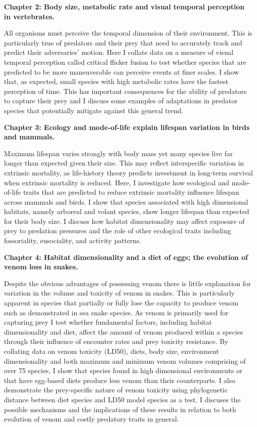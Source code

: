 \textbf{Chapter 2: Body size, metabolic rate and visual temporal perception in vertebrates.}

 All organisms must perceive the temporal dimension of their environment. This is particularly true of predators and their prey that need to accurately track and predict their adversaries' motion. Here I collate data on a measure of visual temporal perception called critical flicker fusion to test whether species that are predicted to be more maneuverable can perceive events at finer scales. I show that, as expected, small species with high metabolic rates have the fastest perception of time. This has important consequences for the ability of predators to capture their prey and I discuss some examples of adaptations in predator species that potentially mitigate against this general trend. 


\textbf{Chapter 3: Ecology and mode-of-life explain lifespan variation in birds and mammals.}

Maximum lifespan varies strongly with body mass yet many species live far longer than expected given their size. This may reflect interspecific variation in extrinsic mortality, as life-history theory predicts investment in long-term survival when extrinsic mortality is reduced. Here, I investigate how ecological and mode-of-life traits that are predicted to reduce extrinsic mortality influence lifespan across mammals and birds. I show that species associated with high dimensional habitats, namely arboreal and volant species, show longer lifespan than expected for their body size. I discuss how habitat dimensionality may affect exposure of prey to predation pressures and the role of other ecological traits including fossoriality, eusociality, and activity patterns.


\textbf{Chapter 4: Habitat dimensionality and a diet of eggs; the evolution of venom loss in snakes.}

Despite the obvious advantages of possessing venom there is little explanation for variation in the volume and toxicity of venom in snakes. This is particularly apparent in species that partially or fully lose the capacity to produce venom such as demonstrated in sea snake species. As venom is primarily used for capturing prey I test whether fundamental factors, including habitat dimensionality and diet, affect the amount of venom produced within a species through their influence of encounter rates and prey toxicity resistance. By collating data on venom toxicity (LD50), diets, body size, environment dimensionality and both maximum and minimum venom volumes comprising of over 75 species, I show that species found in high dimensional environments or that have egg-based diets produce less venom than their counterparts. I also demonstrate the prey-specific nature of venom toxicity using phylogenetic distance between diet species and LD50 model species as a test. I discuses the possible mechanisms and the implications of these results in relation to both evolution of venom and costly predatory traits in general.

